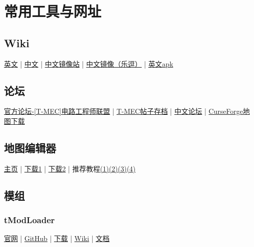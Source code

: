 \chapter{常用工具与网址}\label{app1}

\section{Wiki}\label{app2}
\href{https://terraria.gamepedia.com/Terraria_Wiki}{英文} | \href{https://terraria-zh.gamepedia.com/Terraria_Wiki}{中文} | \href{http://terraria.1tu.me/}{中文镜像站} | \href{http://trwiki.uu.cc/}{中文镜像（乐逗）} | \href{https://terraria-wiki.fileplanet.com/apk/download#}{英文apk}

\section{论坛}
\href{https://forums.terraria.org/index.php?forums/t-mec-terraria-mechanical-engineering-corps.194/}{官方论坛-[T-MEC]电路工程师联盟} | \href{https://github.com/putianyi889/TMECbackup}{T-MEC帖子存档} | \href{https://www.bbstr.net/}{中文论坛} | \href{https://www.curseforge.com/terraria/maps}{CurseForge地图下载}

\section{地图编辑器}\label{app3}
\href{https://github.com/TEdit/Terraria-Map-Editor}{主页} | \href{http://www.binaryconstruct.com/downloads/}{下载1} | \href{https://github.com/TEdit/Terraria-Map-Editor/releases}{下载2} | 推荐教程\href{http://v.youku.com/v_show/id_XMjYxNTUzOTMyOA}{(1)}\href{http://v.youku.com/v_show/id_XMjY0NDYwMTM3Ng}{(2)}\href{http://v.youku.com/v_show/id_XMjY1OTIzNjg4OA}{(3)}\href{http://v.youku.com/v_show/id_XMjY3ODQwODE1Ng}{(4)}

\section{模组}
\subsection{tModLoader}\label{app4}
\href{https://www.tmodloader.net/}{官网} | \href{https://github.com/tModLoader/tModLoader}{GitHub} | \href{https://github.com/tModLoader/tModLoader/releases}{下载} | \href{https://github.com/tModLoader/tModLoader/wiki}{Wiki} | \href{https://tmodloader.github.io/tModLoader/html/annotated.html}{文档}

